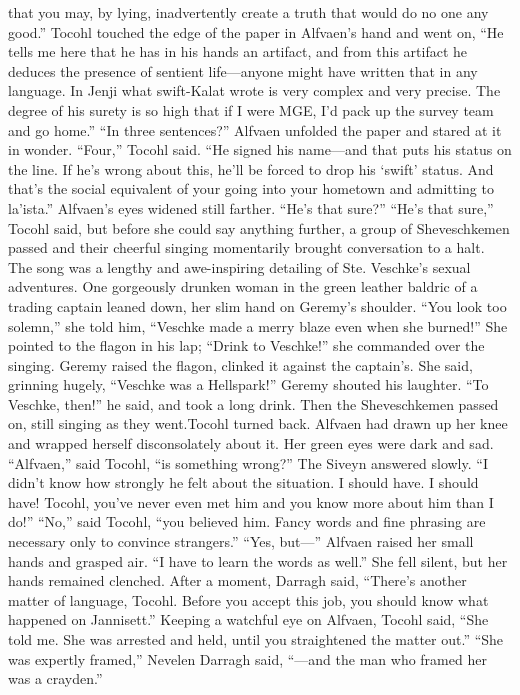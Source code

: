 \documentclass[9pt]{article}
\begin{document}
that you may, by lying, inadvertently create a truth that would do no one any good.”
Tocohl touched the edge of the paper in Alfvaen’s hand and went on, “He tells me here that he has in
his hands an artifact, and from this artifact he deduces the presence of sentient life—anyone might have
written that in any language. In Jenji what swift-Kalat wrote is very complex and very precise. The
degree of his surety is so high that if I were MGE, I’d pack up the survey team and go home.”
“In three sentences?” Alfvaen unfolded the paper and stared at it in wonder.
“Four,” Tocohl said. “He signed his name—and that puts his status on the line. If he’s wrong about
this, he’ll be forced to drop his ‘swift’ status. And that’s the social equivalent of your going into your
hometown and admitting to la’ista.”
Alfvaen’s eyes widened still farther. “He’s that sure?”
“He’s that sure,” Tocohl said, but before she could say anything further, a group of Sheveschkemen
passed and their cheerful singing momentarily brought conversation to a halt. The song was a lengthy and
awe-inspiring detailing of Ste. Veschke’s sexual adventures.
One gorgeously drunken woman in the green leather baldric of a trading captain leaned down, her
slim hand on Geremy’s shoulder. “You look too solemn,” she told him, “Veschke made a merry blaze
even when she burned!” She pointed to the flagon in his lap; “Drink to Veschke!” she commanded over
the singing.
Geremy raised the flagon, clinked it against the captain’s. She said, grinning hugely, “Veschke was a
Hellspark!”
Geremy shouted his laughter. “To Veschke, then!” he said, and took a long drink. Then the
Sheveschkemen passed on, still singing as they went.Tocohl turned back.
Alfvaen had drawn up her knee and wrapped herself disconsolately about it. Her green eyes were
dark and sad.
“Alfvaen,” said Tocohl, “is something wrong?”
The Siveyn answered slowly. “I didn’t know how strongly he felt about the situation. I should have. I
should have! Tocohl, you’ve never even met him and you know more about him than I do!”
“No,” said Tocohl, “you believed him. Fancy words and fine phrasing are necessary only to convince
strangers.”
“Yes, but—” Alfvaen raised her small hands and grasped air. “I have to learn the words as well.”
She fell silent, but her hands remained clenched.
After a moment, Darragh said, “There’s another matter of language, Tocohl. Before you accept this
job, you should know what happened on Jannisett.”
Keeping a watchful eye on Alfvaen, Tocohl said,
“She told me. She was arrested and held, until you straightened the matter out.”
“She was expertly framed,” Nevelen Darragh said, “—and the man who framed her was a crayden.”
\end{document}
